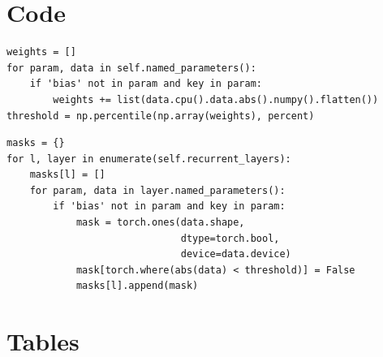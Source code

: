 \chapter{Code}

\begin{code}
\label{code:threshold}
\begin{verbatim}
weights = []
for param, data in self.named_parameters():
    if 'bias' not in param and key in param:
        weights += list(data.cpu().data.abs().numpy().flatten())
threshold = np.percentile(np.array(weights), percent)
\end{verbatim}
\end{code}

\begin{code}
\label{code:mask}
\begin{verbatim}
masks = {}
for l, layer in enumerate(self.recurrent_layers):
    masks[l] = []
    for param, data in layer.named_parameters():
        if 'bias' not in param and key in param:
            mask = torch.ones(data.shape,
                              dtype=torch.bool,
                              device=data.device)
            mask[torch.where(abs(data) < threshold)] = False
            masks[l].append(mask)
\end{verbatim}
\end{code}

\chapter{Tables}\label{app:tables}

